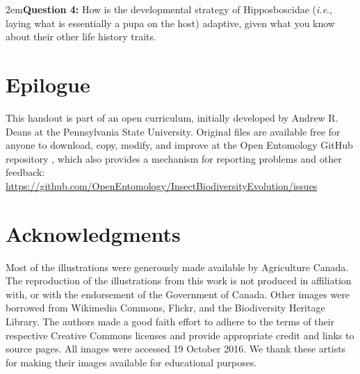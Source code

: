 \documentclass[letterpaper, 11pt]{article}
\begin{document}
\hangindent2em\textbf{Question 4:} How is the developmental strategy of Hipposboscidae (\textit{i.e}., laying what is essentially a pupa on the host) adaptive, given what you know about their other life history traits.\\

\FloatBarrier
\clearpage

\section*{Epilogue}
This handout is part of an open curriculum, initially developed by Andrew R. Deans at the Pennsylvania State University. Original files are available free for anyone to download, copy, modify, and improve at the Open Entomology GitHub repository \citep{ENT532}, which also provides a mechanism for reporting problems and other feedback:\\
\url{https://github.com/OpenEntomology/InsectBiodiversityEvolution/issues}

\section*{Acknowledgments}
Most of the illustrations were generously made available by Agriculture Canada. The reproduction of the illustrations from this work is not produced in affiliation with, or with the endorsement of the Government of Canada. Other images were borrowed from Wikimedia Commons, Flickr, and the Biodiversity Heritage Library. The authors made a good faith effort to adhere to the terms of their respective Creative Commons licenses and provide appropriate credit and links to source pages. All images were accessed 19 October 2016. We thank these artists for making their images available for educational purposes.

\FloatBarrier


\end{document}

